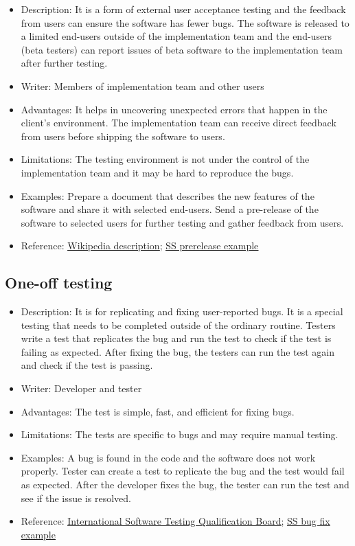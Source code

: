 \documentclass[
]{book}
\begin{document}
\begin{itemize}
\item
  Description: It is a form of external user acceptance testing and the feedback from users can ensure the software has fewer bugs. The software is released to a limited end-users outside of the implementation team and the end-users (beta testers) can report issues of beta software to the implementation team after further testing.
\item
  Writer: Members of implementation team and other users
\item
  Advantages: It helps in uncovering unexpected errors that happen in the client's environment. The implementation team can receive direct feedback from users before shipping the software to users.
\item
  Limitations: The testing environment is not under the control of the implementation team and it may be hard to reproduce the bugs.
\item
  Examples: Prepare a document that describes the new features of the software and share it with selected end-users. Send a pre-release of the software to selected users for further testing and gather feedback from users.
\item
  Reference: \href{https://en.wikipedia.org/wiki/Software_testing}{\underline{Wikipedia description}}; \href{https://github.com/nmfs-stock-synthesis/stock-synthesis/releases/tag/v3.30.18-prerel}{\underline{SS prerelease example}}
\end{itemize}

\hypertarget{one-off-testing}{%
\subsection{One-off testing}\label{one-off-testing}}

\begin{itemize}
\item
  Description: It is for replicating and fixing user-reported bugs. It is a special testing that needs to be completed outside of the ordinary routine. Testers write a test that replicates the bug and run the test to check if the test is failing as expected. After fixing the bug, the testers can run the test again and check if the test is passing.
\item
  Writer: Developer and tester
\item
  Advantages: The test is simple, fast, and efficient for fixing bugs.
\item
  Limitations: The tests are specific to bugs and may require manual testing.
\item
  Examples: A bug is found in the code and the software does not work properly. Tester can create a test to replicate the bug and the test would fail as expected. After the developer fixes the bug, the tester can run the test and see if the issue is resolved.
\item
  Reference: \href{https://glossary.istqb.org/en/search/confirmation}{\underline{International Software Testing Qualification Board}}; \href{https://github.com/nmfs-stock-synthesis/stock-synthesis/issues/148}{\underline{SS bug fix example}}
\end{itemize}
\end{document}
